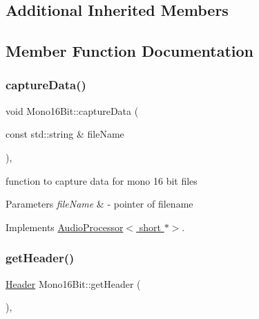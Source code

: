 \subsection*{Additional Inherited Members}


\subsection{Member Function Documentation}
\mbox{\label{classMono16Bit_adc338eb2b8f56cf676f55900e769e785}} 
\subsubsection{\texorpdfstring{capture\+Data()}{captureData()}}
{\footnotesize\ttfamily void Mono16\+Bit\+::capture\+Data (\begin{DoxyParamCaption}\item[{const std\+::string \&}]{file\+Name }\end{DoxyParamCaption})\hspace{0.3cm}{\ttfamily [override]}, {\ttfamily [virtual]}}



function to capture data for mono 16 bit files 


\begin{DoxyParams}{Parameters}
{\em file\+Name} & -\/ pointer of filename \\
\hline
\end{DoxyParams}


Implements \hyperlink{classAudioProcessor_a0d6d6ef552e671405150d2cfbd4095c5}{Audio\+Processor$<$ short $\ast$$>$}.

\mbox{\label{classMono16Bit_a1aee92e83b4d88385af39e00909afdaa}} 
\subsubsection{\texorpdfstring{get\+Header()}{getHeader()}}
{\footnotesize\ttfamily \hyperlink{structHeader}{Header} Mono16\+Bit\+::get\+Header (\begin{DoxyParamCaption}{ }\end{DoxyParamCaption})\hspace{0.3cm}{\ttfamily [override]}, {\ttfamily [virtual]}}



